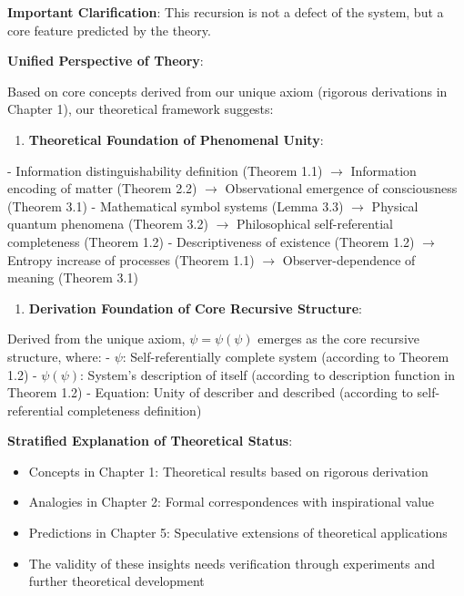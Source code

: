 \textbf{Important Clarification}: This recursion is not a defect of the system, but a core feature predicted by the theory.

\textbf{Unified Perspective of Theory}:

Based on core concepts derived from our unique axiom (rigorous derivations in Chapter 1), our theoretical framework suggests:

\begin{enumerate}
\item \textbf{Theoretical Foundation of Phenomenal Unity}:
\end{enumerate}
   - Information distinguishability definition (Theorem 1.1) $\rightarrow$ Information encoding of matter (Theorem 2.2) $\rightarrow$ Observational emergence of consciousness (Theorem 3.1)
   - Mathematical symbol systems (Lemma 3.3) $\rightarrow$ Physical quantum phenomena (Theorem 3.2) $\rightarrow$ Philosophical self-referential completeness (Theorem 1.2)
   - Descriptiveness of existence (Theorem 1.2) $\rightarrow$ Entropy increase of processes (Theorem 1.1) $\rightarrow$ Observer-dependence of meaning (Theorem 3.1)

\begin{enumerate}
\item \textbf{Derivation Foundation of Core Recursive Structure}:
\end{enumerate}
   Derived from the unique axiom, $\psi = \psi(\psi)$ emerges as the core recursive structure, where:
   - $\psi$: Self-referentially complete system (according to Theorem 1.2)
   - $\psi(\psi)$: System's description of itself (according to description function in Theorem 1.2)
   - Equation: Unity of describer and described (according to self-referential completeness definition)

\textbf{Stratified Explanation of Theoretical Status}:
\begin{itemize}
\item Concepts in Chapter 1: Theoretical results based on rigorous derivation
\item Analogies in Chapter 2: Formal correspondences with inspirational value
\item Predictions in Chapter 5: Speculative extensions of theoretical applications
\item The validity of these insights needs verification through experiments and further theoretical development
\end{itemize}

